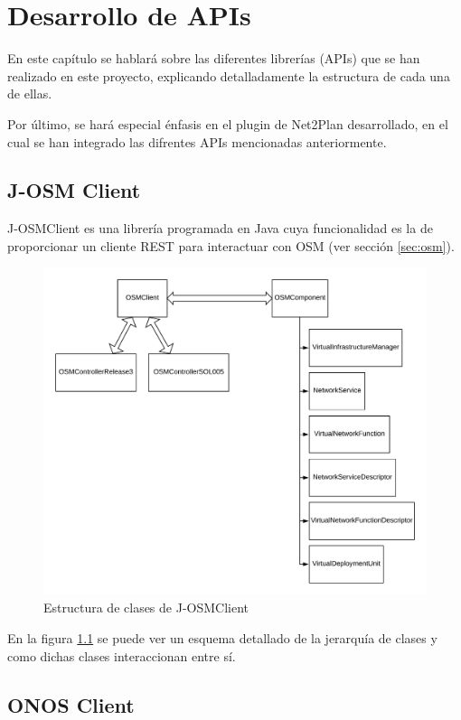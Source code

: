 \chapter{Desarrollo de APIs}

En este capítulo se hablará sobre las diferentes librerías (APIs) que se han realizado en este proyecto, explicando detalladamente la estructura de cada una de ellas.

Por último, se hará especial énfasis en el plugin de Net2Plan desarrollado, en el cual se han integrado las difrentes APIs mencionadas anteriormente.


\section{J-OSM Client}
\label{sec:osmclient}

J-OSMClient es una librería programada en Java cuya funcionalidad es la de proporcionar un cliente REST para interactuar con OSM (ver sección \ref{sec:osm}).

\begin{figure}[!ht]
	\centering
	\includegraphics[width=0.8\linewidth]{imagenes/OSMClient}
	\caption{Estructura de clases de J-OSMClient}
	\label{fig:osmclient}
\end{figure}

En la figura \ref{fig:osmclient} se puede ver un esquema detallado de la jerarquía de clases y como dichas clases interaccionan entre sí.


\section{ONOS Client}
\label{sec:onosclient}

